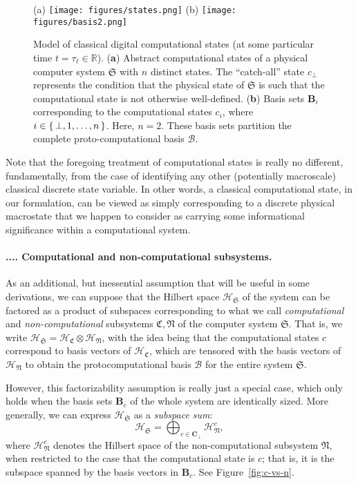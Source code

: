 \documentclass[preprints,article,accept,moreauthors,pdftex]{Definitions/mdpi}
\newcommand{\mypara}[1]{\paragraph{\arabic{section}.\arabic{subsection}.\arabic{subsubsection}.\arabic{paragraph}. #1}}
\begin{document}
\begin{figure}[t] %
\centerline{(a) \texttt{[image: figures/states.png]}
\hspace{1 cm}(b) \texttt{[image: figures/basis2.png]}}
\caption{Model of classical digital computational states (at some particular time $t = \tau_\ell \in \mathbb{R}$). (\textbf{a}) Abstract computational states of a physical computer system $\mathfrak{S}$ with $n$ distinct states. The ``catch-all'' state $c_\bot$ represents the condition that the physical state of $\mathfrak{S}$ is such that the computational state is not otherwise well-defined. (\textbf{b}) Basis sets $\boldsymbol{B}_i$ corresponding to the computational states $c_i$, where $i\in\set{\bot,1,\ldots,n}$. Here, $n=2$. These basis sets partition the complete proto-computational basis $\boldsymbol{\mathcal{B}}$.\label{fig:comp-states}}
\end{figure}   

Note that the foregoing treatment of computational states is really no different, fundamentally, from the case of identifying any other (potentially macroscale) classical discrete state variable. In other words, a classical computational state, in our formulation, can be viewed as simply corresponding to a discrete physical macrostate that we happen to consider as carrying some informational significance within a computational system.

\mypara{Computational and non-computational subsystems.}\label{par:c-vs-nc}
As an additional, but inessential assumption that will be useful in some derivations, we can suppose that the Hilbert space $\mathcal{H}_\mathfrak{S}$ of the system can be factored as a product of subspaces corresponding to what we call {\em computational} and {\em non-computational} subsystems $\mathfrak{C},\mathfrak{N}$ of the computer system $\mathfrak{S}$. That is, we write $\mathcal{H}_\mathfrak{S} = \mathcal{H}_\mathfrak{C} \otimes \mathcal{H}_\mathfrak{N}$, with the idea being that the computational states $c$ correspond to basis vectors of $\mathcal{H}_\mathfrak{C}$, which are tensored with the basis vectors of $\mathcal{H}_\mathfrak{N}$ to obtain the protocomputational basis $\boldsymbol{\mathcal{B}}$ for the entire system $\mathfrak{S}$. 

However, this factorizability assumption is really just a special case, which only holds when the basis sets $\boldsymbol{B}_c$ of the whole system are identically sized. More generally, we can express $\mathcal{H}_\mathfrak{S}$ as a {\em subspace sum}:
\begin{equation}
    \label{eq:subspace-sum}
    \mathcal{H}_\mathfrak{S} = \bigoplus_{c\in\boldsymbol{C}_\bot} \mathcal{H}^c_\mathfrak{N},
\end{equation}
where $\mathcal{H}^c_\mathfrak{N}$ denotes the Hilbert space of the non-computational subsystem $\mathfrak{N}$, when restricted to the case that the computational state is $c$; that is, it is the subspace spanned by the basis vectors in $\boldsymbol{B}_c$. See Figure~\ref{fig:c-vs-n}.
\end{document}
